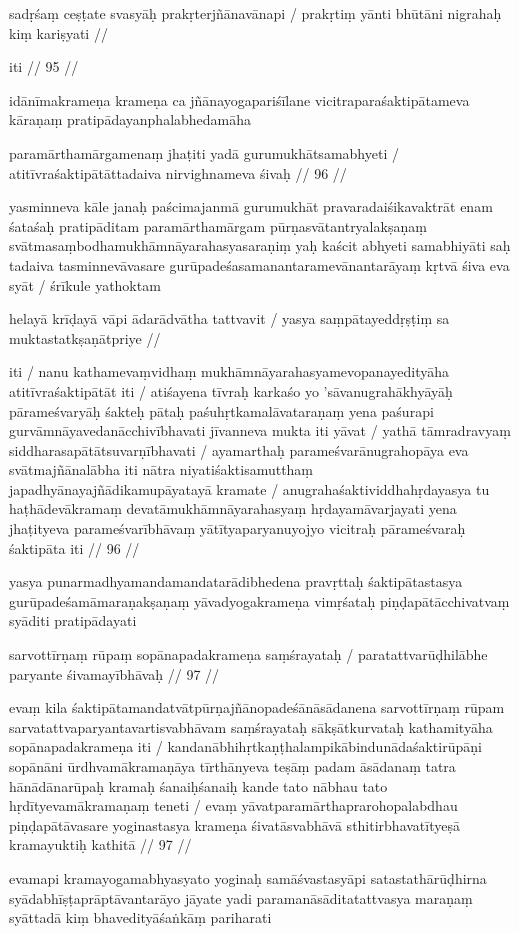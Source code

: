 sadṛśaṃ ceṣṭate svasyāḥ prakṛterjñānavānapi  /
prakṛtiṃ yānti bhūtāni nigrahaḥ kiṃ kariṣyati  //

iti  // 95  //

idānīmakrameṇa krameṇa ca jñānayogapariśīlane vicitraparaśaktipātameva kāraṇaṃ pratipādayanphalabhedamāha

paramārthamārgamenaṃ jhaṭiti yadā gurumukhātsamabhyeti  /
atitīvraśaktipātāttadaiva nirvighnameva śivaḥ  // 96  //

yasminneva kāle janaḥ paścimajanmā gurumukhāt pravaradaiśikavaktrāt enam śataśaḥ pratipāditam paramārthamārgam pūrṇasvātantryalakṣaṇaṃ svātmasaṃbodhamukhāmnāyarahasyasaraṇiṃ yaḥ kaścit abhyeti samabhiyāti saḥ tadaiva tasminnevāvasare gurūpadeśasamanantaramevānantarāyaṃ kṛtvā śiva eva syāt  / śrīkule yathoktam

helayā krīḍayā vāpi ādarādvātha tattvavit  /
yasya saṃpātayeddṛṣṭiṃ sa muktastatkṣaṇātpriye  //

iti  / nanu kathamevaṃvidhaṃ mukhāmnāyarahasyamevopanayedityāha atitīvraśaktipātāt iti  / atiśayena tīvraḥ karkaśo yo 'sāvanugrahākhyāyāḥ pārameśvaryāḥ śakteḥ pātaḥ paśuhṛtkamalāvataraṇaṃ yena paśurapi gurvāmnāyavedanācchivībhavati jīvanneva mukta iti yāvat  / yathā tāmradravyaṃ siddharasapātātsuvarṇībhavati  / ayamarthaḥ parameśvarānugrahopāya eva svātmajñānalābha iti nātra niyatiśaktisamutthaṃ japadhyānayajñādikamupāyatayā kramate  / anugrahaśaktividdhahṛdayasya tu haṭhādevākramaṃ devatāmukhāmnāyarahasyaṃ hṛdayamāvarjayati yena jhaṭityeva parameśvarībhāvaṃ yātītyaparyanuyojyo vicitraḥ pārameśvaraḥ śaktipāta iti  // 96  //

yasya punarmadhyamandamandatarādibhedena pravṛttaḥ śaktipātastasya gurūpadeśamāmaraṇakṣaṇaṃ yāvadyogakrameṇa vimṛśataḥ piṇḍapātācchivatvaṃ syāditi pratipādayati

sarvottīrṇaṃ rūpaṃ sopānapadakrameṇa saṃśrayataḥ  /
paratattvarūḍhilābhe paryante śivamayībhāvaḥ  // 97  //

evaṃ kila śaktipātamandatvātpūrṇajñānopadeśānāsādanena sarvottīrṇaṃ rūpam sarvatattvaparyantavartisvabhāvam saṃśrayataḥ sākṣātkurvataḥ kathamityāha sopānapadakrameṇa iti  / kandanābhihṛtkaṇṭhalampikābindunādaśaktirūpāṇi sopānāni ūrdhvamākramaṇāya tīrthānyeva teṣāṃ padam āsādanaṃ tatra hānādānarūpaḥ kramaḥ śanaiḥśanaiḥ kande tato nābhau tato hṛdītyevamākramaṇaṃ teneti  / evaṃ yāvatparamārthaprarohopalabdhau piṇḍapātāvasare yoginastasya krameṇa śivatāsvabhāvā sthitirbhavatītyeṣā kramayuktiḥ kathitā  // 97  //

evamapi kramayogamabhyasyato yoginaḥ samāśvastasyāpi satastathārūḍhirna syādabhīṣṭaprāptāvantarāyo jāyate yadi paramanāsāditatattvasya maraṇaṃ syāttadā kiṃ bhavedityāśaṅkāṃ pariharati

